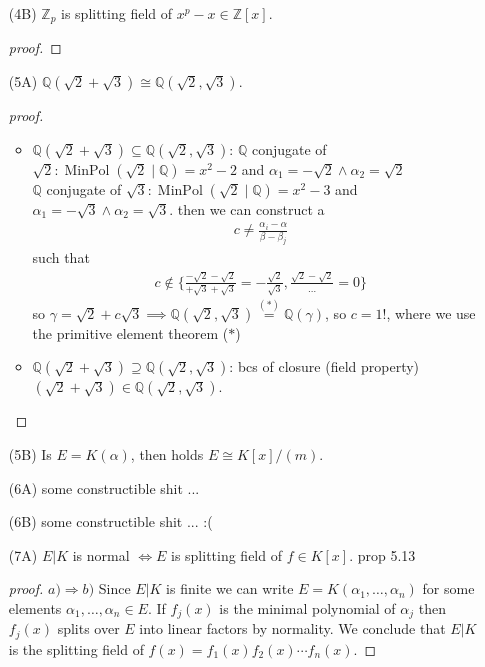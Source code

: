 \documentclass[]{scrartcl}
\newcommand{\Z}{\mathbb{Z}}
\newcommand{\Q}{\mathbb{Q}}
\newcommand{\<}{\trianglelefteq}
\DeclareMathOperator{\MinPol}{MinPol}
\begin{document}
\begin{itemize}
\begin{proof}[solution]
		why is this an autmorphism? well we can use the universal property of polynomial rings. %
	\end{proof}
	\item[(4B)] $\Z_p$ is splitting field of $x^p - x \in \Z[x]$.
	\begin{proof}[proof]
		
	\end{proof}
	\item[(5A)] $\Q(\sqrt{2} + \sqrt{3}) \cong \Q(\sqrt{2},\sqrt{3})$.
	\begin{proof}[proof]
		\begin{itemize}
			\item $\Q(\sqrt{2} + \sqrt{3}) \subseteq \Q(\sqrt{2},\sqrt{3})$:
			$\Q$ conjugate of $\sqrt{2}\colon \MinPol(\sqrt{2} \mid \Q) = x^2-2$ and $\alpha_1 = -\sqrt{2} \wedge \alpha_2 = \sqrt{2}$\\
			$\Q$ conjugate of $\sqrt{3}\colon \MinPol(\sqrt{2} \mid \Q) = x^2-3$ and $\alpha_1 = -\sqrt{3} \wedge \alpha_2 = \sqrt{3}$.
			then we can construct a
			\begin{align*}
				c \neq \frac{\alpha_i - \alpha}{\beta - \beta_j}
			\end{align*}
			such that 
			\begin{align*}
				c \notin \{\frac{-\sqrt{2} - \sqrt{2}}{+\sqrt{3} + \sqrt{3}} = -\frac{\sqrt{2}}{\sqrt{3}}, \frac{\sqrt{2} - \sqrt{2}}{\dots} = 0\}
			\end{align*}
			so $\gamma = \sqrt{2} + c\sqrt{3} \implies \Q(\sqrt{2}, \sqrt{3}) \overset{(\ast)}{=} \Q(\gamma)$, so $c = 1$!, where we use the primitive element theorem ($\ast$)
			\item $\Q(\sqrt{2} + \sqrt{3}) \supseteq \Q(\sqrt{2},\sqrt{3})$:
		    bcs of closure (field property) $(\sqrt{2}+\sqrt{3}) \in \mathbb{Q}(\sqrt{2},\sqrt{3})$.
		\end{itemize} 
	\end{proof}
	\item[(5B)] Is $E = K(\alpha)$, then holds $E \cong K[x]/(m)$.
	\item[(6A)] some constructible shit ...
	\item[(6B)] some constructible shit ... :(
	\item[(7A)] $E|K$ is normal $\Longleftrightarrow E$ is splitting field of $f \in K[x]$. prop 5.13
	\begin{proof}[proof]
		$ a) \Rightarrow b) $ Since $ E|K $ is finite we can write $ E = K(\alpha_1, \dots, \alpha_n) $ for some elements 
		$ \alpha_1, \dots, \alpha_n \in E $. If $ f_j(x) $ is the minimal polynomial of $ \alpha_j $ then $ f_j(x) $ splits 
		over $ E $ into linear factors by normality. We
		conclude that $ E|K $ is the splitting field of $ f(x)
		= f_1(x) f_2(x) \cdots f_n(x) $. 
		

\end{proof}
\end{itemize}
\end{document}
